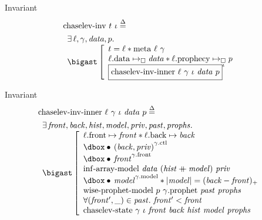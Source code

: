 \begin{frame}{Invariant}
\begin{align*}
		&\mathrm{chaselev \mathhyphen inv}\ t\ \iota
		\eqdef
	\\
		&\begin{array}{l}
				\exists \ell, \gamma, \mathit{data}, p .\ 
			\\
				\iBigsep\left[\begin{array}{l}
						t = \ell \iSep
						\mathrm{meta}\ \ell\ \gamma
					\\
						\ell\mathrm{.data} \mapsto_\square \mathit{data} \iSep
						\ell\mathrm{.prophecy} \mapsto_\square p
					\\
						\iInv{\iota}{\mathrm{chaselev \mathhyphen inv \mathhyphen inner}\ \ell\ \gamma\ \iota\ \mathit{data}\ p}
				\end{array}\right.
		\end{array}
\end{align*}
\end{frame}


\begin{frame}{Invariant}
\begin{align*}
		&\mathrm{chaselev \mathhyphen inv \mathhyphen inner}\ \ell\ \gamma\ \iota\ \mathit{data}\ p
		\eqdef
	\\
		&\begin{array}{l}
				\exists \mathit{front}, \mathit{back}, \mathit{hist}, \mathit{model}, \mathit{priv}, \mathit{past}, \mathit{prophs} .\ 
			\\
				\iBigsep\left[\begin{array}{l}
						\ell\mathrm{.front} \mapsto \mathit{front} \iSep
						\ell\mathrm{.back} \mapsto \mathit{back}
					\\
						\iGhost{\gamma\mathrm{.ctl}}{\iAuth{(\mathit{back}, \mathit{priv})}}
					\\
						\iGhost{\gamma\mathrm{.front}}{\iAuth{\mathit{front}}}
					\\
						\mathrm{inf \mathhyphen array \mathhyphen model}\ \mathit{data}\ (\mathit{hist} \mdoubleplus \mathit{model})\ \mathit{priv}
					\\
						\iGhost{\gamma\mathrm{.model}}{\iAuth{\mathit{model}}} \iSep
						| \mathit{model} | = (\mathit{back} - \mathit{front})_+
					\\
						\mathrm{wise \mathhyphen prophet \mathhyphen model}\ p\ \gamma\mathrm{.prophet}\ \mathit{past}\ \mathit{prophs}
					\\
						\forall (\mathit{front'}, \_) \in \mathit{past} .\ \mathit{front'} < \mathit{front}
					\\
						\mathrm{chaselev \mathhyphen state}\ \gamma\ \iota\ \mathit{front}\ \mathit{back}\ \mathit{hist}\ \mathit{model}\ \mathit{prophs}
				\end{array}\right.
		\end{array}
\end{align*}
\end{frame}